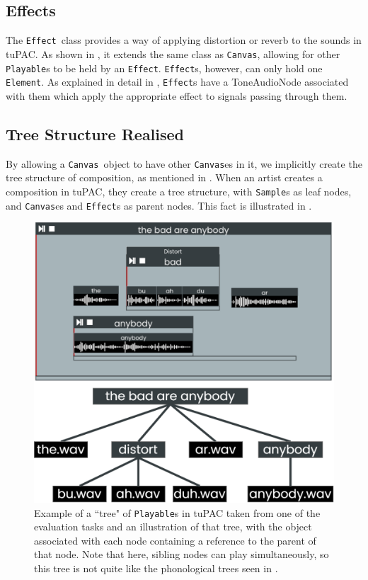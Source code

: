 \documentclass[12pt,a4paper,oneside,openright]{report}
\newcommand{\element}{\texttt{Element}}
\newcommand{\canvas}{\texttt{Canvas}}
\newcommand{\playable}{\texttt{Playable}}
\newcommand{\sample}{\texttt{Sample}}
\newcommand{\effect}{\texttt{Effect}}
\begin{document}
\subsection{Effects}
The \effect\ class provides a way of applying distortion or reverb to the sounds in tuPAC. As shown in , it extends the same class as \canvas, allowing for other \playable s to be held by an \effect. \effect s, however, can only hold one \element. As explained in detail in , \effect s have a ToneAudioNode associated with them which apply the appropriate effect to signals passing through them.

\subsection{Tree Structure Realised}
By allowing a \canvas\ object to have other \canvas es in it, we implicitly create the tree structure of composition, as mentioned in . When an artist creates a composition in tuPAC, they create a tree structure, with \sample s as leaf nodes, and \canvas es and \effect s as parent nodes. This fact is illustrated in .

\begin{figure}[h!]
    \centering
    \includegraphics[scale=0.4]{images/canvas_tree.png}
    \caption{Example of a ``tree" of \playable s in tuPAC taken from one of the evaluation tasks and an illustration of that tree, with the object associated with each node containing a reference to the parent of that node. Note that here, sibling nodes can play simultaneously, so this tree is not quite like the phonological trees seen in \protect\footnotemark. }
    \label{fig:canvas_tree}
\end{figure}
\end{document}
